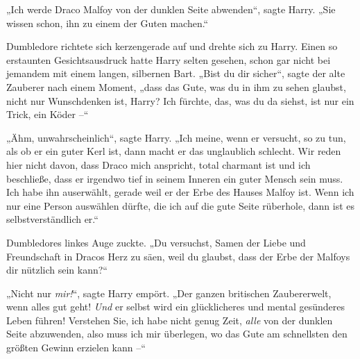 „Ich werde Draco Malfoy von der dunklen Seite abwenden“, sagte Harry. „Sie wissen schon, ihn zu einem der Guten machen.“

Dumbledore richtete sich kerzengerade auf und drehte sich zu Harry. Einen so erstaunten Gesichtsausdruck hatte Harry selten gesehen, schon gar nicht bei jemandem mit einem langen, silbernen Bart. „Bist du dir sicher“, sagte der alte Zauberer nach einem Moment, „dass das Gute, was du in ihm zu sehen glaubst, nicht nur Wunschdenken ist, Harry? Ich fürchte, das, was du da siehst, ist nur ein Trick, ein Köder –“

„Ähm, unwahrscheinlich“, sagte Harry. „Ich meine, wenn er versucht, so zu tun, als ob er ein guter Kerl ist, dann macht er das unglaublich schlecht. Wir reden hier nicht davon, dass Draco mich anspricht, total charmant ist und ich beschließe, dass er irgendwo tief in seinem Inneren ein guter Mensch sein muss. Ich habe ihn auserwählt, gerade weil er der Erbe des Hauses Malfoy ist. Wenn ich nur eine Person auswählen dürfte, die ich auf die gute Seite rüberhole, dann ist es selbstverständlich er.“

Dumbledores linkes Auge zuckte. „Du versuchst, Samen der Liebe und Freundschaft in Dracos Herz zu säen, weil du glaubst, dass der Erbe der Malfoys dir nützlich sein kann?“

„Nicht nur \emph{mir!}“, sagte Harry empört. „Der ganzen britischen Zaubererwelt, wenn alles gut geht! \emph{Und} er selbst wird ein glücklicheres und mental gesünderes Leben führen! Verstehen Sie, ich habe nicht genug Zeit, \emph{alle} von der dunklen Seite abzuwenden, also muss ich mir überlegen, wo das Gute am schnellsten den größten Gewinn erzielen kann –“

